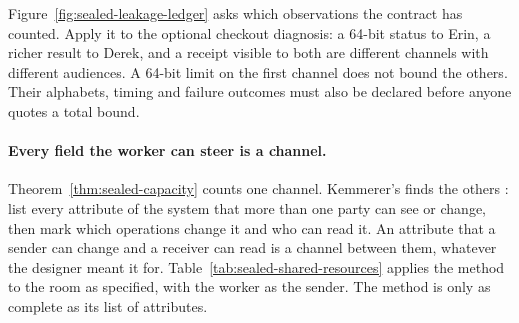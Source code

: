 \documentclass[11pt,a4paper]{article}
\theoremstyle{definition}
\begin{document}
Figure~\ref{fig:sealed-leakage-ledger} asks which observations the contract
has counted. Apply it to the optional checkout diagnosis: a 64-bit status to
Erin, a richer result to Derek, and a receipt visible to both are different
channels with different audiences. A 64-bit limit on the first channel does
not bound the others. Their alphabets, timing and failure outcomes must also
be declared before anyone quotes a total bound.



\paragraph{Every field the worker can steer is a channel.}
Theorem~\ref{thm:sealed-capacity} counts one channel. Kemmerer's
 finds the others : list
every attribute of the system that more than one party can see or change,
then mark which operations change it and who can read it. An attribute that a
sender can change and a receiver can read is a channel between them, whatever
the designer meant it for. Table~\ref{tab:sealed-shared-resources} applies
the method to the room as specified, with the worker as the sender. The
method is only as complete as its list of attributes.
\end{document}
